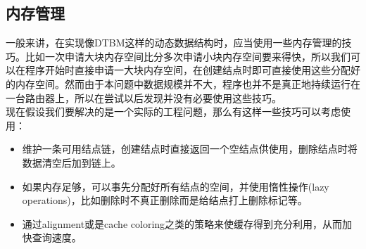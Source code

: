 \subsection{内存管理}

一般来讲，在实现像DTBM这样的动态数据结构时，应当使用一些内存管理的技巧。比如一次申请大块内存空间比分多次申请小块内存空间要来得快，所以我们可以在程序开始时直接申请一大块内存空间，在创建结点时即可直接使用这些分配好的内存空间。然而由于本问题中数据规模并不大，程序也并不是真正地持续运行在一台路由器上，所以在尝试以后发现并没有必要使用这些技巧。\\
\indent
现在假设我们要解决的是一个实际的工程问题，那么有这样一些技巧可以考虑使用：
\begin{itemize}
\item 维护一条可用结点链，创建结点时直接返回一个空结点供使用，删除结点时将数据清空后加到链上。
\item 如果内存足够，可以事先分配好所有结点的空间，并使用惰性操作(lazy operations)，比如删除时不真正删除而是给结点打上删除标记等。
\item 通过alignment或是cache coloring之类的策略来使缓存得到充分利用，从而加快查询速度。
\end{itemize}

\clearpage